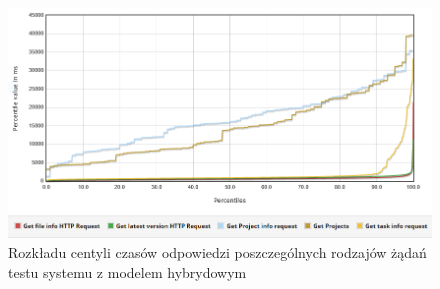 \begin{figure}[!ht]
\centering
\includegraphics[width=\textwidth]{figures/wykres.PNG}
\caption{Rozkładu centyli czasów odpowiedzi poszczególnych rodzajów żądań testu systemu z modelem hybrydowym}
\label{fig:hybridReadResponseTimePercentiles}
\end{figure}
